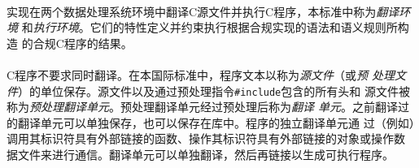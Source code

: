 
\paragraph{}
实现在两个数据处理系统环境中翻译C源文件并执行C程序，本标准中称为\textit{翻译环境
}和\textit{执行环境}。它们的特性定义并约束执行根据合规实现的语法和语义规则所构造
的合规C程序的结果。


\paragraph{}
C程序不要求同时翻译。在本国际标准中，程序文本以称为\textit{源文件}（或\textit{预
处理文件}）的单位保存。源文件以及通过预处理指令\texttt{\#include}包含的所有头和
源文件被称为\textit{预处理翻译单元}。预处理翻译单元经过预处理后称为\textit{翻译
单元}。之前翻译过的翻译单元可以单独保存，也可以保存在库中。程序的独立翻译单元通
过（例如）调用其标识符具有外部链接的函数、操作其标识符具有外部链接的对象或操作数
据文件来进行通信。翻译单元可以单独翻译，然后再链接以生成可执行程序。


